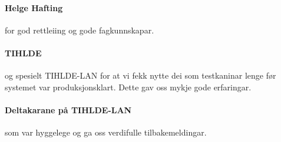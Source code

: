 \documentclass[nynorsk,12pt,a4paper,oneside]{book}
\begin{document}
\paragraph{Helge Hafting} for god rettleiing og gode fagkunnskapar.
\paragraph{TIHLDE} og spesielt TIHLDE-LAN for at vi fekk nytte dei som testkaninar lenge før systemet var produksjonsklart. Dette gav oss mykje gode erfaringar.
\paragraph{Deltakarane på TIHLDE-LAN} som var hyggelege og ga oss verdifulle tilbakemeldingar.
\end{document}
